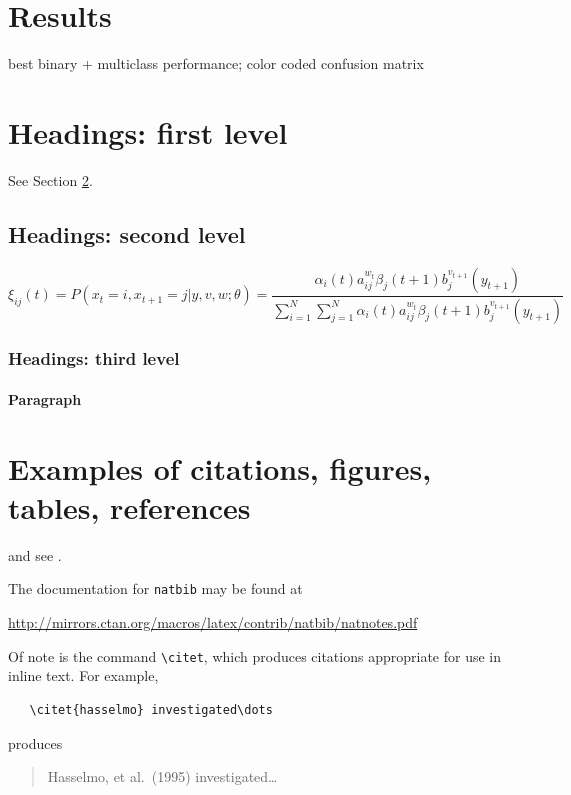 \documentclass{article}
\begin{document}
\section{Results}
best binary + multiclass performance;
color coded confusion matrix

\pagebreak
\section{Headings: first level}
\label{sec:headings}

\lipsum[4] See Section \ref{sec:headings}.

\subsection{Headings: second level}
\lipsum[5]
\begin{equation}
\xi _{ij}(t)=P(x_{t}=i,x_{t+1}=j|y,v,w;\theta)= {\frac {\alpha _{i}(t)a^{w_t}_{ij}\beta _{j}(t+1)b^{v_{t+1}}_{j}(y_{t+1})}{\sum _{i=1}^{N} \sum _{j=1}^{N} \alpha _{i}(t)a^{w_t}_{ij}\beta _{j}(t+1)b^{v_{t+1}}_{j}(y_{t+1})}}
\end{equation}

\subsubsection{Headings: third level}
\lipsum[6]

\paragraph{Paragraph}
\lipsum[7]

\section{Examples of citations, figures, tables, references}
\label{sec:others}
\lipsum[8] \cite{kour2014real,kour2014fast} and see \cite{hadash2018estimate}.

The documentation for \verb+natbib+ may be found at
\begin{center}
  \url{http://mirrors.ctan.org/macros/latex/contrib/natbib/natnotes.pdf}
\end{center}
Of note is the command \verb+\citet+, which produces citations
appropriate for use in inline text.  For example,
\begin{verbatim}
   \citet{hasselmo} investigated\dots
\end{verbatim}
produces
\begin{quote}
  Hasselmo, et al.\ (1995) investigated\dots
\end{quote}
\end{document}

